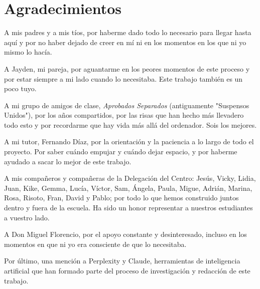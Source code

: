
\chapter*{Agradecimientos}

A mis padres y a mis tíos, por haberme dado todo lo necesario para llegar hasta aquí y por no haber dejado de creer en mí ni en los momentos en los que ni yo mismo lo hacía.

A Jayden, mi pareja, por aguantarme en los peores momentos de este proceso y por estar siempre a mi lado cuando lo necesitaba. Este trabajo también es un poco tuyo.

A mi grupo de amigos de clase, \textit{Aprobados Separados} (antiguamente "Suspensos Unidos"), por los años compartidos, por las risas que han hecho más llevadero todo esto y por recordarme que hay vida más allá del ordenador. Sois los mejores.

A mi tutor, Fernando Díaz, por la orientación y la paciencia a lo largo de todo el proyecto. Por saber cuándo empujar y cuándo dejar espacio, y por haberme ayudado a sacar lo mejor de este trabajo.

A mis compañeros y compañeras de la Delegación del Centro: Jesús, Vicky, Lidia, Juan, Kike, Gemma, Lucía, Víctor, Sam, Ángela, Paula, Migue, Adrián, Marina, Rosa, Risoto, Fran, David y Pablo; por todo lo que hemos construido juntos dentro y fuera de la escuela. Ha sido un honor representar a nuestros estudiantes a vuestro lado.

A Don Miguel Florencio, por el apoyo constante y desinteresado, incluso en los momentos en que ni yo era consciente de que lo necesitaba.

Por último, una mención a Perplexity y Claude, herramientas de inteligencia artificial que han formado parte del proceso de investigación y redacción de este trabajo.
